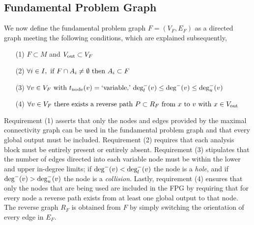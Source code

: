 \subsection{Fundamental Problem Graph}
	\label{ss:FPG}
	We now define the fundamental problem graph $F=(V_F,E_F)$ as a directed graph meeting the following conditions, which are explained subsequently,
	\begin{enumerate}
	\item[(1)] $F \subset M$ and $V_\textrm{out} \subset V_F$
	\item[(2)] $\displaystyle{\forall i \in I, \textrm{ if } F \cap A_i \neq \emptyset \textrm{ then } A_i \subset F}$
	\item[(3)] $\displaystyle{\forall v \in V_F \textrm{ with } t_\textrm{node}(v) = \textrm{`variable,'} \  \textrm{deg}_l^-(v) \leq \textrm{deg}^-(v) \leq \textrm{deg}_u^-(v)}$
	\item[(4)] $\displaystyle{\forall v \in V_F \textrm{ there exists a reverse path } P \subset R_F \textrm{ from } x \textrm{ to } v \textrm{ with } x\in V_\textrm{out}}$
	\end{enumerate}
	Requirement (1) asserts that only the nodes and edges provided by the maximal connectivity graph can be used in the fundamental problem graph and that every global output must be included. 
	Requirement (2) requires that each analysis block must be entirely present or entirely absent. 
	Requirement (3) stipulates that the number of edges directed into each variable node must be within the lower and upper in-degree limits; 
	if $\textrm{deg}^-(v) < \textrm{deg}_l^-(v)$ the node is a \emph{hole}, and if $\textrm{deg}^-(v) > \textrm{deg}_u^-(v)$ the node is a \emph{collision}.
	Lastly, requirement (4) ensures that only the nodes that are being used are included in the FPG by requiring that for every node a reverse path exists from at least one global output to that node. 
	The reverse graph $R_F$ is obtained from $F$ by simply switching the orientation of every edge in $E_F$.


